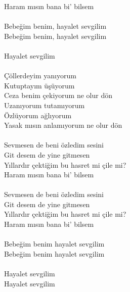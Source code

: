 \documentclass{proc}
\begin{document}
Haram m{\i}s{\i}n bana bi' bilsem\\
\\
Bebe\u{g}im benim, hayalet sevgilim\\
Bebe\u{g}im benim, hayalet sevgilim\\
\\
Hayalet sevgilim\\
\\
\c{C}\"{o}llerdeyim yan{\i}yorum\\
Kutuptay{\i}m \"{u}ş\"{u}yorum\\
Ceza benim \c{c}ekiyorum ne olur d\"{o}n\\
Uzan{\i}yorum tutam{\i}yorum\\
Özl\"{u}yorum a\u{g}l{\i}yorum\\
Yasak m{\i}s{\i}n anlam{\i}yorum ne olur d\"{o}n\\
\\
Sevmesen de beni \"{o}zledim sesini\\
Git desem de yine gitmesen\\
Y{\i}llard{\i}r \c{c}ekti\u{g}im bu hasret mi \c{c}ile mi?\\
Haram m{\i}s{\i}n bana bi' bilsem\\
\\
Sevmesen de beni \"{o}zledim sesini\\
Git desem de yine gitmesen\\
Y{\i}llard{\i}r \c{c}ekti\u{g}im bu hasret mi \c{c}ile mi?\\
Haram m{\i}s{\i}n bana bi' bilsem\\
\\
Bebe\u{g}im benim hayalet sevgilim\\
Bebe\u{g}im benim hayalet sevgilim\\
\\
Hayalet sevgilim\\
Hayalet sevgilim\\
\end{document}
